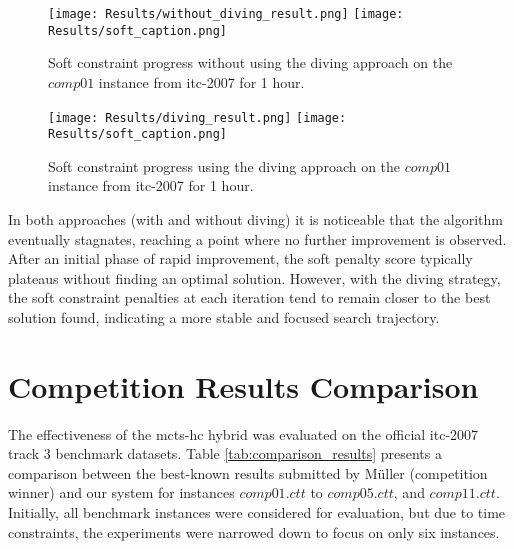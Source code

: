 \begin{figure}
 \centering
    \texttt{[image: Results/without\_diving\_result.png]}
    \texttt{[image: Results/soft\_caption.png]}
    \caption{Soft constraint progress without using the diving approach on the \(comp01\) instance from \ac{itc-2007} for 1 hour.}
    \label{fig:without_diving_result}
\end{figure}

\begin{figure}
 \centering
    \texttt{[image: Results/diving\_result.png]}
    \texttt{[image: Results/soft\_caption.png]}
    \caption{Soft constraint progress using the diving approach on the \(comp01\) instance from \ac{itc-2007} for 1 hour.}
    \label{fig:diving_result}
\end{figure}

In both approaches (with and without diving) it is noticeable that the algorithm eventually stagnates, reaching a point where no further improvement is observed. After an initial phase of rapid improvement, the soft penalty score typically plateaus without finding an optimal solution. However, with the diving strategy, the soft constraint penalties at each iteration tend to remain closer to the best solution found, indicating a more stable and focused search trajectory.

\section{Competition Results Comparison}

The effectiveness of the \ac{mcts}-\ac{hc} hybrid was evaluated on the official \ac{itc-2007} track 3 benchmark datasets. Table \ref{tab:comparison_results} presents a comparison between the best-known results submitted by Müller (competition winner) and our system for instances \(comp01.ctt\) to \(comp05.ctt\), and \(comp11.ctt\). Initially, all benchmark instances were considered for evaluation, but due to time constraints, the experiments were narrowed down to focus on only six instances.

